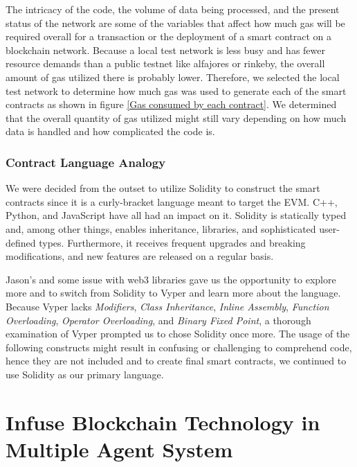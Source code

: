 \vspace{.5cm}
The intricacy of the code, the volume of data being processed, and the present status of the network are some of the variables that affect how much gas will be required overall for a transaction or the deployment of a smart contract on a blockchain network. Because a local test network is less busy and has fewer resource demands than a public testnet like alfajores or rinkeby, the overall amount of gas utilized there is probably lower. Therefore, we selected the local test network to determine how much gas was used to generate each of the smart contracts as shown in figure \ref{Gas consumed by each contract}. We determined that the overall quantity of gas utilized might still vary depending on how much data is handled and how complicated the code is.


\subsubsection{Contract Language Analogy}

We were decided from the outset to utilize Solidity to construct the smart contracts since it is a curly-bracket language meant to target the \ac{EVM}. C++, Python, and JavaScript have all had an impact on it. Solidity is statically typed and, among other things, enables inheritance, libraries, and sophisticated user-defined types. Furthermore, it receives frequent upgrades and breaking modifications, and new features are released on a regular basis. 

\vspace{.5cm}

Jason's and some issue with web3 libraries gave us the opportunity to explore more and to switch from Solidity to Vyper and learn more about the language. Because Vyper lacks \textit{Modifiers}, \textit{Class Inheritance}, \textit{Inline Assembly}, \textit{Function Overloading}, \textit{Operator Overloading}, and \textit{Binary Fixed Point}, a thorough examination of Vyper prompted us to chose Solidity once more. The usage of the following constructs might result in confusing or challenging to comprehend code, hence they are not included and to create final smart contracts, we continued to use Solidity as our primary language.


\section{Infuse Blockchain Technology in Multiple Agent System}

